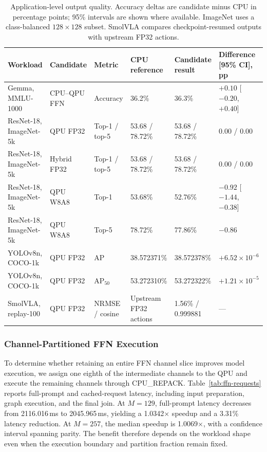 \documentclass[sigplan,screen,review]{acmart}
\begin{document}
\begin{table}[t]
\centering
\caption{Application-level output quality. Accuracy deltas are candidate minus CPU in percentage points; 95\% intervals are shown where available. ImageNet uses a class-balanced $128\times128$ subset. SmolVLA compares checkpoint-resumed outputs with upstream FP32 actions.}
\label{tab:model-quality}
\small
\begin{tabular}{@{}llllll@{}}
\toprule
Workload & Candidate & Metric & CPU reference & Candidate result & Difference [95\% CI], pp \\
\midrule
Gemma, MMLU-1000
& CPU--QPU FFN & Accuracy
& 36.2\% & 36.3\% & $+0.10$ [$-0.20$, $+0.40$] \\

\midrule
ResNet-18, ImageNet-5k
& QPU FP32 & Top-1 / top-5
& 53.68 / 78.72\% & 53.68 / 78.72\% & 0.00 / 0.00 \\

ResNet-18, ImageNet-5k
& Hybrid FP32 & Top-1 / top-5
& 53.68 / 78.72\% & 53.68 / 78.72\% & 0.00 / 0.00 \\

ResNet-18, ImageNet-5k
& QPU W8A8 & Top-1
& 53.68\% & 52.76\% & $-0.92$ [$-1.44$, $-0.38$] \\

ResNet-18, ImageNet-5k
& QPU W8A8 & Top-5
& 78.72\% & 77.86\% & $-0.86$ \\

\midrule

YOLOv8n, COCO-1k
& QPU FP32 & AP
& 38.572371\% & 38.572378\% & $+6.52\times10^{-6}$ \\

YOLOv8n, COCO-1k
& QPU FP32 & AP$_{50}$
& 53.272310\% & 53.272322\% & $+1.21\times10^{-5}$ \\

\midrule
SmolVLA, replay-100
& QPU FP32 & NRMSE / cosine
& Upstream FP32 actions & 1.56\% / 0.999881 & --- \\
\bottomrule
\end{tabular}
\end{table}




\subsubsection{Channel-Partitioned FFN Execution}
\label{sec:ffn-results}

To determine whether retaining an entire FFN channel slice improves model execution, we assign one eighth of the intermediate channels to the QPU and execute the remaining channels through CPU\_REPACK. Table~\ref{tab:ffn-requests} reports full-prompt and cached-request latency, including input preparation, graph execution, and the final join. At $M=129$, full-prompt latency decreases from 2116.016\,ms to 2045.965\,ms, yielding a 1.0342$\times$ speedup and a 3.31\% latency reduction. At $M=257$, the median speedup is 1.0069$\times$, with a confidence interval spanning parity. The benefit therefore depends on the workload shape even when the execution boundary and partition fraction remain fixed.
\end{document}
